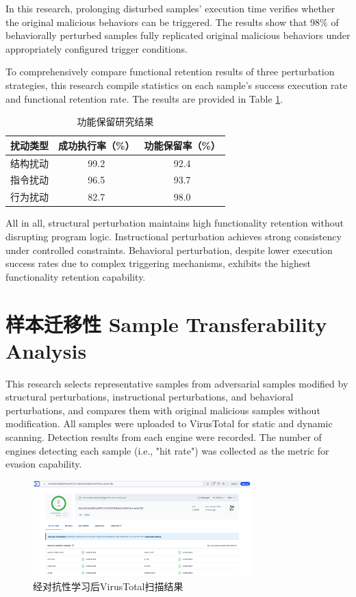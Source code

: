 In this research, prolonging disturbed samples' execution time verifies whether the original malicious behaviors can be triggered. The results show that 98\% of behaviorally perturbed samples fully replicated original malicious behaviors under appropriately configured trigger conditions.

To comprehensively compare functional retention results of three perturbation strategies, this research compile statistics on each sample's success execution rate and functional retention rate. The results are provided in Table \ref{tab:5.12}.

\begin{table}[htb]
	\centering
	\caption{功能保留研究结果}
	\label{tab:5.12}
	\begin{tabular*}{0.9\textwidth}{@{\extracolsep{\fill}}ccc}
		\toprule
		扰动类型 & 成功执行率（\%） & 功能保留率（\%） \\
		\midrule
		结构扰动 & 99.2 & 92.4 \\
		指令扰动 & 96.5 & 93.7 \\
		行为扰动 & 82.7 & 98.0 \\
		\bottomrule
	\end{tabular*}
\end{table}

All in all, structural perturbation maintains high functionality retention without disrupting program logic. Instructional perturbation achieves strong consistency under controlled constraints. Behavioral perturbation, despite lower execution success rates due to complex triggering mechanisms, exhibits the highest functionality retention capability.

\section{样本迁移性 Sample Transferability Analysis}

This research selects representative samples from adversarial samples modified by structural perturbations, instructional perturbations, and behavioral perturbations, and compares them with original malicious samples without modification. All samples were uploaded to VirusTotal for static and dynamic scanning. Detection results from each engine were recorded. The number of engines detecting each sample (i.e., "hit rate") was collected as the metric for evasion capability.

\begin{figure}[htbp]
	\centering
	\includegraphics[width=0.75\textwidth]{figures/5.3}
	\caption{经对抗性学习后VirusTotal扫描结果}\label{fig:5.3}
\end{figure}


